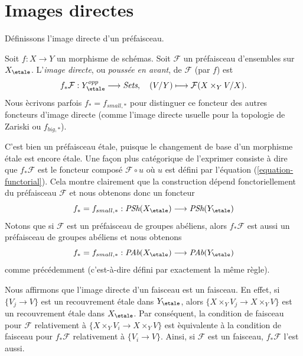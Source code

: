 \section{Images directes}
\label{section-direct-image}

\noindent
D\'efinissons l'image directe d'un pr\'efaisceau.

\begin{definition}
\label{definition-direct-image-presheaf}
Soit $f: X\to Y$ un morphisme de sch\'emas.
Soit $\mathcal{F} $ un pr\'efaisceau d'ensembles sur $X_\etale$.
L'{\it image directe}, ou {\it pouss\'ee en avant}, de $\mathcal{F}$
(par $f$) est
$$
f_*\mathcal{F} : Y_\etale^{opp} \longrightarrow \textit{Sets}, \quad
(V/Y) \longmapsto \mathcal{F}(X \times_Y V/X).
$$
Nous \`ecrivons parfois $f_* = f_{small, *}$ pour distinguer ce foncteur des autres
foncteurs d'image directe (comme l'image directe usuelle pour la topologie de Zariski ou $f_{big, *}$).
\end{definition}

\noindent
C'est bien un pr\'efaisceau \'etale, puisque le changement de base d'un morphisme
\'etale est encore \'etale. Une fa\c{c}on plus cat\'egorique de l'exprimer consiste \`a dire que
$f_*\mathcal{F}$ est le foncteur compos\'e $\mathcal{F} \circ u$
o\`u $u$ est d\'efini par l'\'equation (\ref{equation-functorial}). Cela montre
clairement que la construction d\'epend fonctoriellement du pr\'efaisceau
$\mathcal{F}$ et nous obtenons donc un foncteur
$$
f_* = f_{small, *} :
\textit{PSh}(X_\etale)
\longrightarrow
\textit{PSh}(Y_\etale)
$$
Notons que si $\mathcal{F}$ est un pr\'efaisceau de groupes ab\'eliens, alors
$f_*\mathcal{F}$ est aussi un pr\'efaisceau de groupes ab\'eliens et nous obtenons
$$
f_* = f_{small, *} :
\textit{PAb}(X_\etale)
\longrightarrow
\textit{PAb}(Y_\etale)
$$
comme pr\'ec\'edemment (c'est-\`a-dire d\'efini par exactement la m\^eme r\`egle).

\begin{remark}
\label{remark-direct-image-sheaf}
Nous affirmons que l'image directe d'un faisceau est un faisceau.
En effet, si $\{V_j \to V\}$ est un recouvrement \'etale dans $Y_\etale$,
alors $\{X \times_Y V_j \to X \times_Y V\}$ est un recouvrement \'etale dans
$X_\etale$. Par cons\'equent, la condition de faisceau pour $\mathcal{F}$ relativement
\`a $\{X \times_Y V_i \to X \times_Y V\}$
est \`equivalente \`a la condition de faisceau pour $f_*\mathcal{F}$ relativement \`a
$\{V_i \to V\}$. Ainsi, si $\mathcal{F}$ est un faisceau,
$f_*\mathcal{F}$ l'est aussi.
\end{remark}

